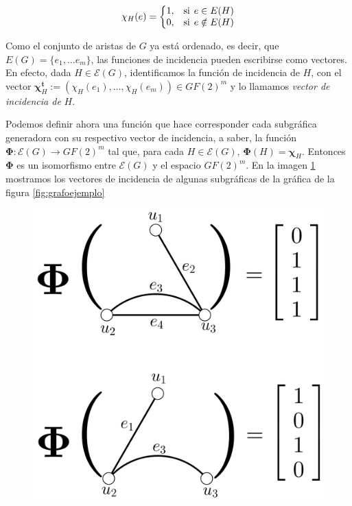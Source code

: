  $$
 \chi_{H}(e) = \left\{\begin{matrix}
1, & \text{si} \hspace{1.5mm} e \in E(H) \\ 
0, & \text{si} \hspace{1.5mm} e\notin E(H)
\end{matrix}\right.
 $$
 
 Como el conjunto de aristas de $G$ ya está ordenado, es decir, que $E(G) = \{e_{1}, \ldots e_{m}\}$, las funciones de incidencia pueden escribirse como vectores. En efecto, dada $H \in \mathcal{E}(G)$, identificamos la función de incidencia de $H$, con el vector $\boldsymbol{\chi}_{H}^{\mathbf{t}}:= (\chi_{H}(e_{1}), \ldots, \chi_{H}(e_{m})) \in GF(2)^m$ y lo llamamos \textit{vector de incidencia de} $H$.
 
 Podemos definir ahora una función que hace corresponder cada subgráfica generadora con su respectivo vector de incidencia, a saber, la función $\boldsymbol{\Phi} \colon \mathcal{E}(G) \rightarrow GF(2)^m$ tal que, para cada $H \in \mathcal{E}(G)$, $\boldsymbol{\Phi}(H) = \boldsymbol{\chi}_{H}$. Entonces $\boldsymbol{\Phi}$ es un isomorfismo entre $\mathcal{E}(G)$ y el espacio $GF(2)^m$.
 En la imagen \ref{fig:grafovector1} mostramos los vectores de incidencia de algunas subgráficas de la gráfica de la figura \ref{fig:grafoejemplo}

 \begin{figure}[H]
    \centering
    \includegraphics[scale=0.2]{img/imgchapter3/grafovector1.jpg}
    \caption{}
    \label{fig:grafovector1}
\end{figure}


